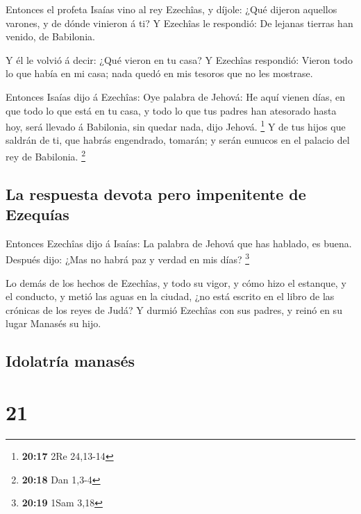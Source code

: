  Entonces el profeta Isaías vino al rey Ezechîas, y
díjole: ¿Qué dijeron aquellos varones, y de dónde vinieron á ti? Y
Ezechîas le respondió: De lejanas tierras han venido, de Babilonia.

 Y él le volvió á decir: ¿Qué vieron en tu casa? Y
Ezechîas respondió: Vieron todo lo que había en mi casa; nada quedó en
mis tesoros que no les mostrase.

 Entonces Isaías dijo á Ezechîas: Oye palabra de Jehová:
 He aquí vienen días, en que todo lo que está en tu casa,
y todo lo que tus padres han atesorado hasta hoy, será llevado á
Babilonia, sin quedar nada, dijo Jehová. \footnote{\textbf{20:17} 2Re
  24,13-14}  Y de tus hijos que saldrán de ti, que habrás
engendrado, tomarán; y serán eunucos en el palacio del rey de Babilonia.
\footnote{\textbf{20:18} Dan 1,3-4}

\hypertarget{la-respuesta-devota-pero-impenitente-de-ezequuxedas}{%
\subsection{La respuesta devota pero impenitente de
Ezequías}\label{la-respuesta-devota-pero-impenitente-de-ezequuxedas}}

 Entonces Ezechîas dijo á Isaías: La palabra de Jehová
que has hablado, es buena. Después dijo: ¿Mas no habrá paz y verdad en
mis días? \footnote{\textbf{20:19} 1Sam 3,18}

 Lo demás de los hechos de Ezechîas, y todo su vigor, y
cómo hizo el estanque, y el conducto, y metió las aguas en la ciudad,
¿no está escrito en el libro de las crónicas de los reyes de Judá?
 Y durmió Ezechîas con sus padres, y reinó en su lugar
Manasés su hijo.

\hypertarget{idolatruxeda-manasuxe9s}{%
\subsection{Idolatría manasés}\label{idolatruxeda-manasuxe9s}}

\hypertarget{section-20}{%
\section{21}\label{section-20}}

